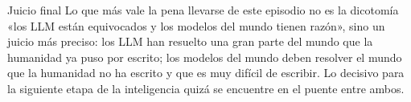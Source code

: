 \begin{importantbox}{Juicio final}
Lo que más vale la pena llevarse de este episodio no es la dicotomía «los LLM están equivocados y los modelos del mundo tienen razón», sino un juicio más preciso: los LLM han resuelto una gran parte del mundo que la humanidad ya puso por escrito; los modelos del mundo deben resolver el mundo que la humanidad no ha escrito y que es muy difícil de escribir. Lo decisivo para la siguiente etapa de la inteligencia quizá se encuentre en el puente entre ambos.
\end{importantbox}


